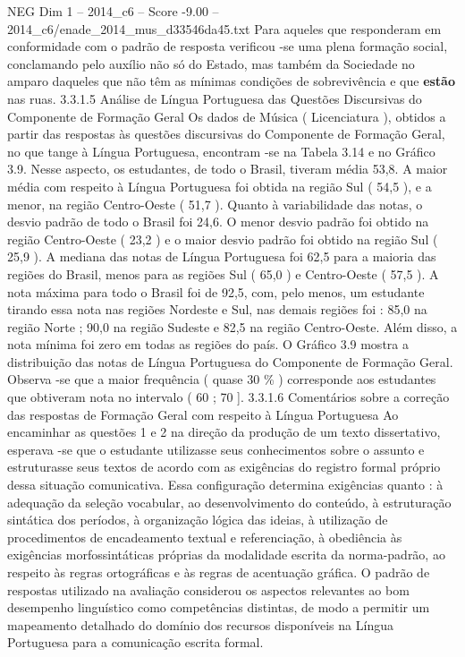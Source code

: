 \begin{textsample}{NEG Dim 1 – 2014\_c6 – Score -9.00 – 2014\_c6/enade\_2014\_mus\_d33546da45.txt}
Para aqueles que responderam em conformidade com o padrão de resposta verificou -se uma plena formação social, conclamando pelo auxílio não só do Estado, mas também da Sociedade no amparo daqueles que não têm as mínimas condições de sobrevivência e que \textbf{estão} nas ruas. 3.3.1.5 Análise de Língua Portuguesa das Questões Discursivas do Componente de Formação Geral Os dados de Música ( Licenciatura ), obtidos a partir das respostas às questões discursivas do Componente de Formação Geral, no que tange à Língua Portuguesa, encontram -se na Tabela 3.14 e no Gráfico 3.9.
Nesse aspecto, os estudantes, de todo o Brasil, tiveram média 53,8.
A maior média com respeito à Língua Portuguesa foi obtida na região Sul ( 54,5 ), e a menor, na região Centro-Oeste ( 51,7 ).
Quanto à variabilidade das notas, o desvio padrão de todo o Brasil foi 24,6.
O menor desvio padrão foi obtido na região Centro-Oeste ( 23,2 ) e o maior desvio padrão foi obtido na região Sul ( 25,9 ).
A mediana das notas de Língua Portuguesa foi 62,5 para a maioria das regiões do Brasil, menos para as regiões Sul ( 65,0 ) e Centro-Oeste ( 57,5 ).
A nota máxima para todo o Brasil foi de 92,5, com, pelo menos, um estudante tirando essa nota nas regiões Nordeste e Sul, nas demais regiões foi : 85,0 na região Norte ; 90,0 na região Sudeste e 82,5 na região Centro-Oeste.
Além disso, a nota mínima foi zero em todas as regiões do país.
O Gráfico 3.9 mostra a distribuição das notas de Língua Portuguesa do Componente de Formação Geral.
Observa -se que a maior frequência ( quase 30 \% ) corresponde aos estudantes que obtiveram nota no intervalo ( 60 ; 70 ]. 3.3.1.6 Comentários sobre a correção das respostas de Formação Geral com respeito à Língua Portuguesa Ao encaminhar as questões 1 e 2 na direção da produção de um texto dissertativo, esperava -se que o estudante utilizasse seus conhecimentos sobre o assunto e estruturasse seus textos de acordo com as exigências do registro formal próprio dessa situação comunicativa.
Essa configuração determina exigências quanto : à adequação da seleção vocabular, ao desenvolvimento do conteúdo, à estruturação sintática dos períodos, à organização lógica das ideias, à utilização de procedimentos de encadeamento textual e referenciação, à obediência às exigências morfossintáticas próprias da modalidade escrita da norma-padrão, ao respeito às regras ortográficas e às regras de acentuação gráfica.
O padrão de respostas utilizado na avaliação considerou os aspectos relevantes ao bom desempenho linguístico como competências distintas, de modo a permitir um mapeamento detalhado do domínio dos recursos disponíveis na Língua Portuguesa para a comunicação escrita formal.

\end{textsample}
